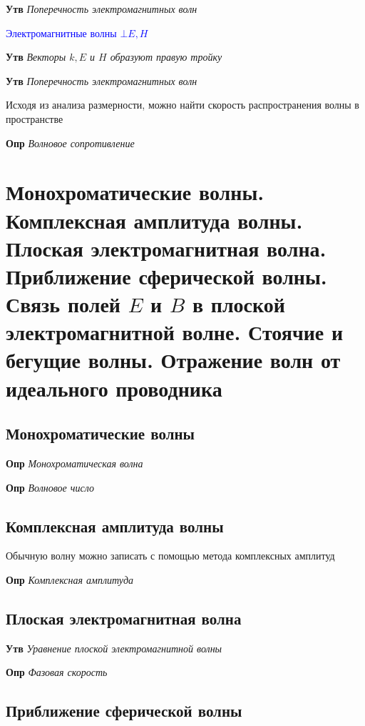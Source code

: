 \documentclass[a4paper, 14pt]{article}
\begin{document}
    \textbf{Утв} \textit{Поперечность электромагнитных волн}
    
    \textcolor{blue}{Электромагнитные волны $\bot E, H$}
    
    \textbf{Утв} \textit{Векторы $k, E$ и $H$ образуют правую тройку}
    
    \textbf{Утв} \textit{Поперечность электромагнитных волн}
    
    Исходя из анализа размерности, можно найти скорость распространения волны в пространстве
    
    \textbf{Опр} \textit{Волновое сопротивление}
    
    \section{Монохроматические волны.
    Комплексная амплитуда волны.
    Плоская электромагнитная волна.
    Приближение сферической волны.
    Связь полей $E$ и $B$ в плоской электромагнитной волне.
    Стоячие и бегущие волны.
    Отражение волн от идеального проводника}
    
    \subsection{Монохроматические волны}
    
    \textbf{Опр} \textit{Монохроматическая волна}
    
    \textbf{Опр} \textit{Волновое число}
    
    \subsection{Комплексная амплитуда волны}
    
    Обычную волну можно записать с помощью метода комплексных амплитуд
    
    \textbf{Опр} \textit{Комплексная амплитуда}
    
    \subsection{Плоская электромагнитная волна}
    
    \textbf{Утв} \textit{Уравнение плоской электромагнитной волны}
    
    \textbf{Опр} \textit{Фазовая скорость}
    
    \subsection{Приближение сферической волны}
    
\end{document}
